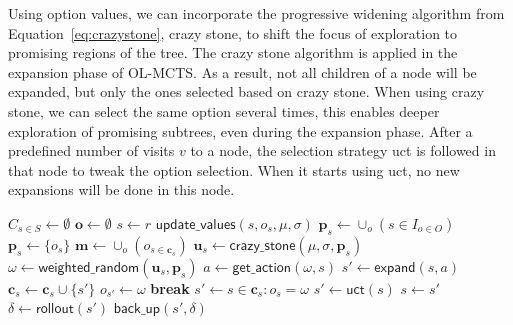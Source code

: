 Using option values, we can incorporate the progressive widening algorithm from
Equation~\ref{eq:crazystone}, crazy stone, to shift the focus of exploration to
promising regions of the tree. The crazy stone algorithm is applied in the
expansion phase of OL-MCTS\@.  As a result, not all children of a node will be
expanded, but only the ones selected based on crazy stone. When using crazy
stone, we can select the same option several times, this enables deeper
exploration of promising subtrees, even during the expansion phase. After a
predefined number of visits $v$ to a node, the selection strategy \textsf{uct}
is followed in that node to tweak the option selection. When it starts using
\textsf{uct}, no new expansions will be done in this node.

\begin{algorithm}[h]
	\caption{$\mathsf{OL-MCTS}(O, r, t, d, v, \mu, \sigma)$}
	\label{alg:olmcts}
	\begin{algorithmic}[1]
		\State $C_{s \in S} \gets \emptyset$
		\State $\mathbf{o} \gets \emptyset$
		 \label{alg:olmcts:mainloop}
			\State $s \gets r$
			 \label{alg:olmcts:innerloop}
				 \label{alg:olmcts:sp}
					\State $\mathsf{update\_values}(s, o_s, \mu, \sigma)$
						 \label{alg:olmcts:update}
					\State $\mathbf{p}_s \gets \cup_o (s \in I_{o \in O})$
				\Else
					\State $\mathbf{p}_s \gets \{o_s\}$
				\EndIf \label{alg:olmcts:scs}
				\State $\mathbf{m} \gets \cup_o (o_{s \in \mathbf{c}_s})$
				 
					\label{alg:olmcts:ns}
					\State $\mathbf{u}_s \gets \mathsf{crazy\_stone}(\mu, \sigma, \mathbf{p}_s)$
					\State $\omega \gets \mathsf{weighted\_random}(\mathbf{u}_s, \mathbf{p}_s)$
					 
						\State $a \gets \mathsf{get\_action}(\omega, s)$ \label{alg:olmcts:scs}
						\State $s' \gets \mathsf{expand}(s, a)$ 
						\State $\mathbf{c}_s \gets \mathbf{c}_s \cup \{s'\}$
						\State $o_{s'} \gets \omega$
						\State \textbf{break} \label{alg:olmcts:ecs}
					\Else {}
						\State $s' \gets s \in \mathbf{c}_s : o_s = \omega$ \label{alg:olmcts:s} 
					\EndIf
				\Else {}
					\State $s' \gets \mathsf{uct}(s)$ \label{alg:olmcts:uct}
				\EndIf \label{alg:olmcts:ecs}
				\State $s \gets s'$ \label{alg:olmcts:ss}
			\EndWhile
			\State $\delta \gets \mathsf{rollout}(s')$ \label{alg:olmcts:rollout}
			\State $\mathsf{back\_up}(s', \delta)$ \label{alg:olmcts:backup}
		\EndWhile
		\State {}
	\end{algorithmic}
\end{algorithm}

